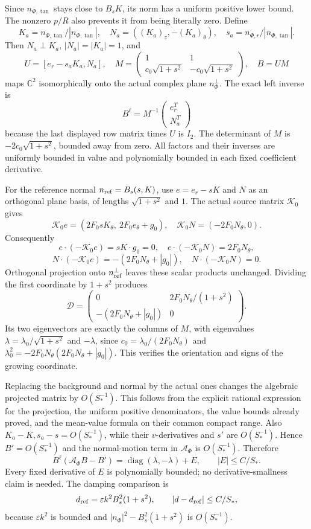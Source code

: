 \documentclass[10pt,a4paper]{article}
\newcommand{\N}{\mathcal N_K}
\begin{document}
Since \(n_{\Phi,\tan}\) stays close to \(B_sK\), its norm has a uniform positive lower bound. The nonzero \(p/R\) also prevents it from being literally zero. Define \[
K_a=n_{\Phi,\tan}/|n_{\Phi,\tan}|,\quad
N_a=((K_a)_z,-(K_a)_\theta),\quad
s_a=n_{\Phi,r}/|n_{\Phi,\tan}|.
\] Then \(N_a\perp K_a\), \(|N_a|=|K_a|=1\), and \[
U=[e_r-s_aK_a,N_a],\quad
M=\begin{pmatrix}1&1\\c_0\sqrt{1+s^2}&-c_0\sqrt{1+s^2}\end{pmatrix},
\quad B=UM
\] maps \(\mathbb C^2\) isomorphically onto the actual complex plane \(n_\Phi^\perp\). The exact left inverse is \[
B^\ell=M^{-1}\begin{pmatrix}e_r^T\\N_a^T\end{pmatrix}
\] because the last displayed row matrix times \(U\) is \(I_2\). The determinant of \(M\) is \(-2c_0\sqrt{1+s^2}\), bounded away from zero. All factors and their inverses are uniformly bounded in value and polynomially bounded in each fixed coefficient derivative.

For the reference normal \(n_{\rm ref}=B_s(s,K)\), use \(e=e_r-sK\) and \(N\) as an orthogonal plane basis, of lengths \(\sqrt{1+s^2}\) and \(1\). The actual source matrix \(\mathcal K_0\) gives \[
\mathcal K_0e=(2F_0sK_\theta,\ 2F_0e_\theta+g_0),\quad
\mathcal K_0N=(-2F_0N_\theta,0).
\] Consequently \[
e\cdot(-\mathcal K_0e)=sK\cdot g_0=0,\quad
e\cdot(-\mathcal K_0N)=2F_0N_\theta,
\] \[
N\cdot(-\mathcal K_0e)=-(2F_0N_\theta+|g_0|),\quad
N\cdot(-\mathcal K_0N)=0.
\] Orthogonal projection onto \(n_{\rm ref}^\perp\) leaves these scalar products unchanged. Dividing the first coordinate by \(1+s^2\) produces \[
\mathcal D=
\begin{pmatrix}
0&2F_0N_\theta/(1+s^2)\\
-(2F_0N_\theta+|g_0|)&0
\end{pmatrix}.
\] Its two eigenvectors are exactly the columns of \(M\), with eigenvalues \(\lambda=\lambda_0/\sqrt{1+s^2}\) and \(-\lambda\), since \(c_0=\lambda_0/(2F_0N_\theta)\) and \(\lambda_0^2=-2F_0N_\theta(2F_0N_\theta+|g_0|)\). This verifies the orientation and signs of the growing coordinate.

Replacing the background and normal by the actual ones changes the algebraic projected matrix by \(O(S_*^{-1})\). This follows from the explicit rational expression for the projection, the uniform positive denominators, the value bounds already proved, and the mean-value formula on their common compact range. Also \(K_a-K,s_a-s=O(S_*^{-1})\), while their \(v\)-derivatives and \(s'\) are \(O(S_*^{-1})\). Hence \(B'=O(S_*^{-1})\) and the normal-motion term in \(\mathcal A_\Phi\) is \(O(S_*^{-1})\). Therefore \[
B^\ell(\mathcal A_\Phi B-B')=
\operatorname{diag}(\lambda,-\lambda)+E,\qquad |E|\le C/S_*.
\] Every fixed derivative of \(E\) is polynomially bounded; no derivative-smallness claim is needed. The damping comparison is \[
d_{\rm ref}=\varepsilon k^2B_s^2(1+s^2),\qquad
|d-d_{\rm ref}|\le C/S_*,
\] because \(\varepsilon k^2\) is bounded and \(|n_\Phi|^2-B_s^2(1+s^2)\) is \(O(S_*^{-1})\).
\end{document}
